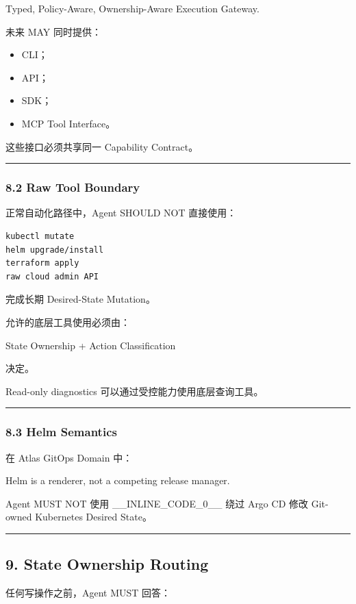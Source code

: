 \documentclass[11pt,a4paper]{article}
\begin{document}
\begin{gfmBlockquote}
Typed, Policy-Aware, Ownership-Aware Execution Gateway.
\end{gfmBlockquote}
未来 MAY 同时提供：

\begin{itemize}
  \item CLI；
  \item API；
  \item SDK；
  \item MCP Tool Interface。
\end{itemize}
这些接口必须共享同一 Capability Contract。

\vspace{0.5em}\hrule\vspace{0.5em}
\subsubsection{8.2 Raw Tool Boundary}
正常自动化路径中，Agent SHOULD NOT 直接使用：

\begin{lstlisting}[language=text]
kubectl mutate
helm upgrade/install
terraform apply
raw cloud admin API
\end{lstlisting}
完成长期 Desired-State Mutation。

允许的底层工具使用必须由：

\begin{gfmBlockquote}
State Ownership + Action Classification
\end{gfmBlockquote}
决定。

Read-only diagnostics 可以通过受控能力使用底层查询工具。

\vspace{0.5em}\hrule\vspace{0.5em}
\subsubsection{8.3 Helm Semantics}
在 Atlas GitOps Domain 中：

\begin{gfmBlockquote}
Helm is a renderer, not a competing release manager.
\end{gfmBlockquote}
Agent MUST NOT 使用 \_\_INLINE\_CODE\_0\_\_ 绕过 Argo CD 修改 Git-owned Kubernetes Desired State。

\vspace{0.5em}\hrule\vspace{0.5em}
\subsection{9. State Ownership Routing}
任何写操作之前，Agent MUST 回答：
\end{document}
